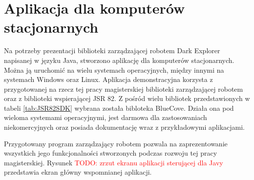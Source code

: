 \section{Aplikacja dla komputerów stacjonarnych}
\label{sec:java-app}
Na potrzeby prezentacji biblioteki zarządzającej robotem Dark Explorer napisanej
w języku Java, stworzono aplikację dla komputerów stacjonarnych. Można ją
uruchomić na wielu systemach operacyjnych, między innymi na systemach Windows
oraz Linux. Aplikacja demonstracyjna korzysta z przygotowanej na rzecz tej pracy
magisterskiej biblioteki zarządzającej robotem oraz z biblioteki wspierającej JSR
82. Z pośród wielu bibliotek przedstawionych w tabeli \ref{tab:JSR82SDK} wybrana
została bibloteka BlueCove\cite{website:bluecove.org}. Działa ona pod wieloma
systemami operacyjnymi, jest darmowa dla zastosowaniach niekomercyjnych oraz
posiada dokumentację wraz z przykładowymi aplikacjami.

Przygotowany program zarządzający robotem pozwala na zaprezentowanie wszystkich
jego funkcjonalności stworzonych podczas rozwoju tej pracy magisterskiej. Rysunek
\textcolor{red}{TODO: zrzut ekranu aplikacji sterującej dla Javy} przedstawia
ekran główny wspomnianej aplikacji.
